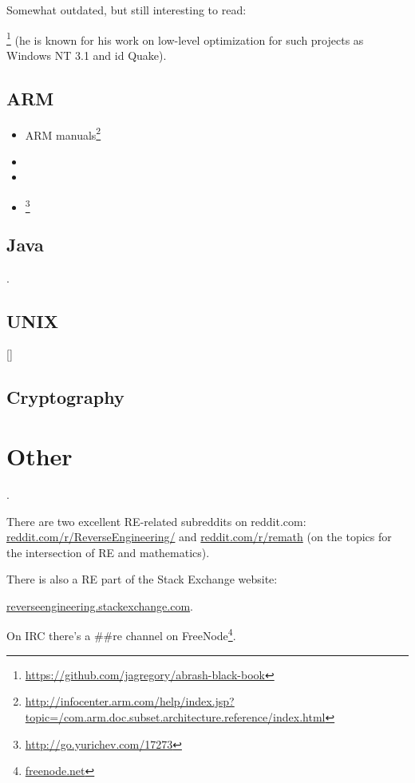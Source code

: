 Somewhat outdated, but still interesting to read:

\MAbrash\footnote{\AlsoAvailableAs \url{https://github.com/jagregory/abrash-black-book}}
(he is known for his work on low-level optimization for such projects as Windows NT 3.1 and id Quake).

\section{ARM}

\begin{itemize}
\item ARM manuals\footnote{\AlsoAvailableAs \url{http://infocenter.arm.com/help/index.jsp?topic=/com.arm.doc.subset.architecture.reference/index.html}}

\item \ARMSevenRef

\item \ARMSixFourRefURL

\item \ARMCookBook\footnote{\AlsoAvailableAs \url{http://go.yurichev.com/17273}}
\end{itemize}

\section{Java}

\JavaBook.

\section{UNIX}

[\TAOUP]

\section{Cryptography}



\chapter{Other}

\HenryWarren.

There are two excellent \ac{RE}-related subreddits on reddit.com:
\href{http://go.yurichev.com/17027}{reddit.com/r/ReverseEngineering/} and
\href{http://go.yurichev.com/17028}{reddit.com/r/remath}
(on the topics for the intersection of \ac{RE} and mathematics).

There is also a \ac{RE} part of the Stack Exchange website:

\par \href{http://go.yurichev.com/17029}{reverseengineering.stackexchange.com}.

On IRC there's a \#\#re channel on
FreeNode\footnote{\href{http://go.yurichev.com/17030}{freenode.net}}.


